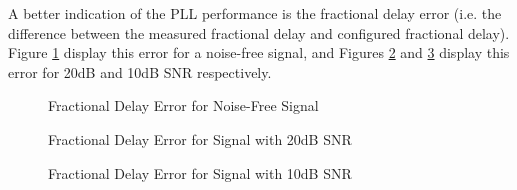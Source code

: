 \documentclass{article}
\begin{document}
A better indication of the PLL performance is the fractional delay error (i.e. the difference between the measured fractional delay and configured fractional delay). Figure \ref{fig::delay_error_no_noise} display this error for a noise-free signal, and Figures \ref{fig::delay_error_20dB_snr} and \ref{fig::delay_error_10dB_snr} display this error for 20dB and 10dB SNR respectively. 

\begin{figure}[H]
	\centerline{}
	\caption{Fractional Delay Error for Noise-Free Signal}
	\label{fig::delay_error_no_noise}
\end{figure}

\begin{figure}[H]
	\centerline{}
	\caption{Fractional Delay Error for Signal with 20dB SNR}
	\label{fig::delay_error_20dB_snr}
\end{figure}

\begin{figure}[H]
	\centerline{}
	\caption{Fractional Delay Error for Signal with 10dB SNR}
	\label{fig::delay_error_10dB_snr}
\end{figure}
\end{document}
